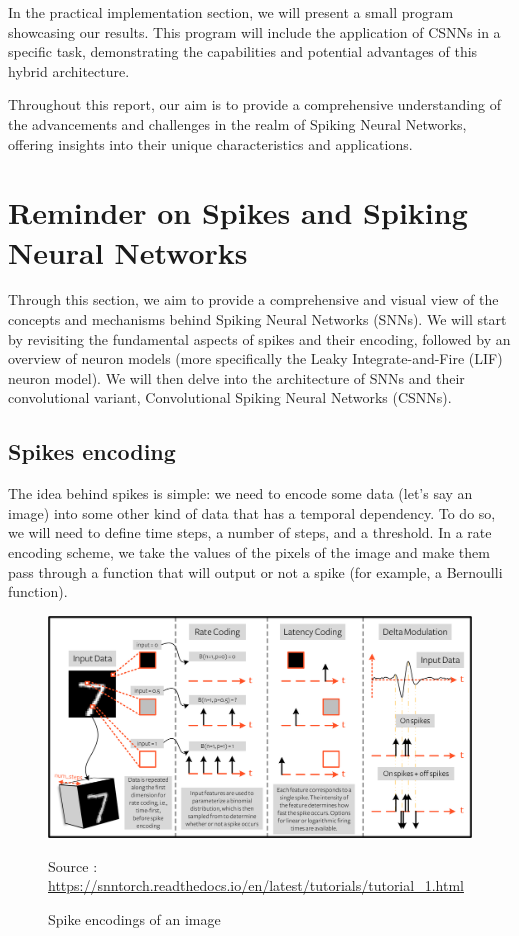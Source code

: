 \documentclass[11pt]{article}
\begin{document}
In the practical implementation section, we will present a small program showcasing our results. This program will include the application of CSNNs in a specific task, demonstrating the capabilities and potential advantages of this hybrid architecture.

Throughout this report, our aim is to provide a comprehensive understanding of the advancements and challenges in the realm of Spiking Neural Networks, offering insights into their unique characteristics and applications.

\pagebreak

\section{Reminder on Spikes and Spiking Neural Networks}

Through this section, we aim to provide a comprehensive and visual view of the concepts and mechanisms behind Spiking Neural Networks (SNNs). We will start by revisiting the fundamental aspects of spikes and their encoding, followed by an overview of neuron models (more specifically the Leaky Integrate-and-Fire (LIF) neuron model). We will then delve into the architecture of SNNs and their convolutional variant, Convolutional Spiking Neural Networks (CSNNs).

\subsection{Spikes encoding}

The idea behind spikes is simple: we need to encode some data (let's say an image) into some other kind of data that has a temporal dependency. To do so, we will need to define time steps, a number of steps, and a threshold.
In a rate encoding scheme, we take the values of the pixels of the image and make them pass through a function that will output or not a spike (for example, a Bernoulli function).


\begin{figure}[ht]
  \centering
  \includegraphics[width=\textwidth]{./image/spikeconv.png}
  \caption{Spike encodings of an image \cite{eshraghian2021training}}
  Source : \url{https://snntorch.readthedocs.io/en/latest/tutorials/tutorial_1.html}
  \label{fig:spikeconversion}
\end{figure}
\end{document}
